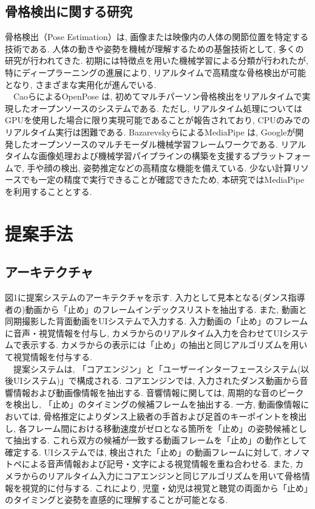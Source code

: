 \documentclass[technicalreport]{ieicej}
\begin{document}
\subsection{骨格検出に関する研究}
骨格検出（Pose Estimation）は, 画像または映像内の人体の関節位置を特定する技術である. 人体の動きや姿勢を機械が理解するための基盤技術として, 多くの研究が行われてきた. 初期には特徴点を用いた機械学習による分類が行われたが, 特にディープラーニングの進展により, リアルタイムで高精度な骨格検出が可能となり, さまざまな実用化が進んでいる. \\
　CaoらによるOpenPose \cite{ref23}は, 初めてマルチパーソン骨格検出をリアルタイムで実現したオープンソースのシステムである. ただし, リアルタイム処理についてはGPUを使用した場合に限り実現可能であることが報告されており, CPUのみでのリアルタイム実行は困難である. BazarevskyらによるMediaPipe \cite{ref24}は, Googleが開発したオープンソースのマルチモーダル機械学習フレームワークである. リアルタイムな画像処理および機械学習パイプラインの構築を支援するプラットフォームで, 手や顔の検出, 姿勢推定などの高精度な機能を備えている. 少ない計算リソースでも一定の精度で実行できることが確認できたため, 本研究ではMediaPipeを利用することとする.
\section{提案手法}
\subsection{アーキテクチャ}
図1に提案システムのアーキテクチャを示す. 入力として見本となる(ダンス指導者の)動画から「止め」のフレームインデックスリストを抽出する. また, 動画と同期撮影した背面動画をUIシステムで入力する. 入力動画の「止め」のフレームに音声・視覚情報を付与し, カメラからのリアルタイム入力を合わせてUIシステムで表示する. カメラからの表示には「止め」の抽出と同じアルゴリズムを用いて視覚情報を付与する. \\
　提案システムは, 「コアエンジン」と「ユーザーインターフェースシステム(以後UIシステム)」で構成される. コアエンジンでは, 入力されたダンス動画から音響情報および動画像情報を抽出する. 音響情報に関しては, 周期的な音のピークを検出し, 「止め」のタイミングの候補フレームを抽出する. 一方, 動画像情報においては, 骨格推定によりダンス上級者の手首および足首のキーポイントを検出し, 各フレーム間における移動速度がゼロとなる箇所を「止め」の姿勢候補として抽出する. これら双方の候補が一致する動画フレームを「止め」の動作として確定する. UIシステムでは, 検出された「止め」の動画フレームに対して, オノマトペによる音声情報および記号・文字による視覚情報を重ね合わせる. また, カメラからのリアルタイム入力にコアエンジンと同じアルゴリズムを用いて骨格情報を視覚的に付与する. これにより, 児童・幼児は視覚と聴覚の両面から「止め」のタイミングと姿勢を直感的に理解することが可能となる. 
\end{document}
